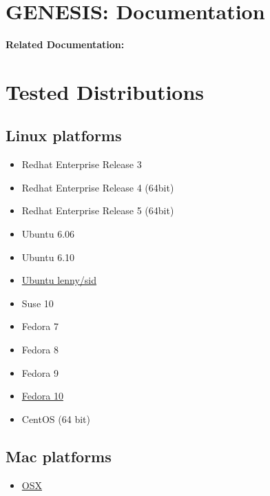 \documentclass[12pt]{article}
\begin{document}
\section*{GENESIS: Documentation}

{\bf Related Documentation:}

\section*{Tested Distributions}

\subsection*{Linux platforms}

\begin{itemize}
\item Redhat Enterprise Release 3
\item Redhat Enterprise Release 4 (64bit)
\item Redhat Enterprise Release 5 (64bit)
\item Ubuntu 6.06
\item Ubuntu 6.10
\item \href{../installation-ubuntu-lennysid/installation-ubuntu-lennysid.tex}{Ubuntu lenny/sid}
\item Suse 10
\item Fedora 7
\item Fedora 8
\item Fedora 9
\item \href{../installation-fedora10/installation-fedora10.tex}{Fedora 10}
\item CentOS (64 bit)%
\end{itemize}

\subsection*{Mac platforms}

\begin{itemize}
\item \href{../installation-osx/installation-osx.tex}{OSX}
\end{itemize}
\end{document}
